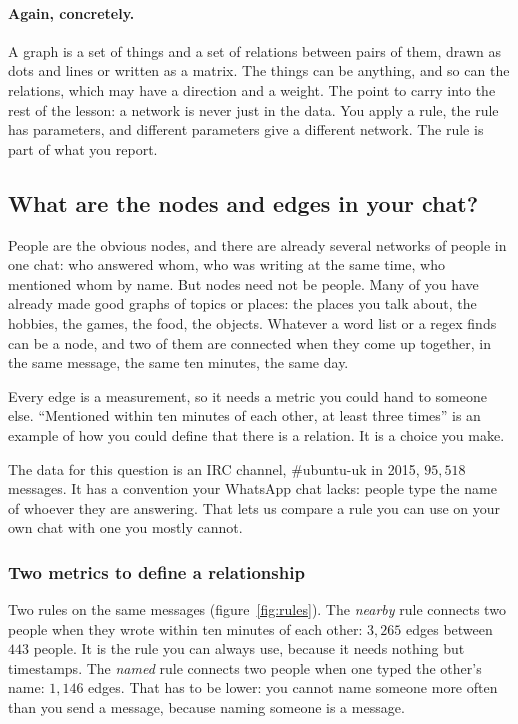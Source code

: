 \documentclass[12pt, a4paper]{article}
\theoremstyle{definition}
\theoremstyle{remark}
\newcommand{\againconcretely}{\paragraph{Again, concretely.}}
\begin{document}
\againconcretely
A graph is a set of things and a set of relations between pairs of them, drawn as dots and lines or written as a matrix. The things can be anything, and so can the relations, which may have a direction and a weight. The point to carry into the rest of the lesson: a network is never just in the data. You apply a rule, the rule has parameters, and different parameters give a different network. The rule is part of what you report.

\subsection{What are the nodes and edges in your chat?}
\label{sec:nodes-edges-chat}
People are the obvious nodes, and there are already several networks of people in one chat: who answered whom, who was writing at the same time, who mentioned whom by name. But nodes need not be people. Many of you have already made good graphs of topics or places: the places you talk about, the hobbies, the games, the food, the objects. Whatever a word list or a regex finds can be a node, and two of them are connected when they come up together, in the same message, the same ten minutes, the same day.

Every edge is a measurement, so it needs a metric you could hand to someone else. ``Mentioned within ten minutes of each other, at least three times'' is an example of how you could define that there is a relation. It is a choice you make.

The data for this question is an IRC channel, \#ubuntu-uk in 2015, $95{,}518$ messages. It has a convention your WhatsApp chat lacks: people type the name of whoever they are answering. That lets us compare a rule you can use on your own chat with one you mostly cannot.

\subsubsection{Two metrics to define a relationship}
Two rules on the same messages (figure~\ref{fig:rules}). The \emph{nearby} rule connects two people when they wrote within ten minutes of each other: $3{,}265$ edges between $443$ people. It is the rule you can always use, because it needs nothing but timestamps. The \emph{named} rule connects two people when one typed the other's name: $1{,}146$ edges. That has to be lower: you cannot name someone more often than you send a message, because naming someone is a message.
\end{document}
